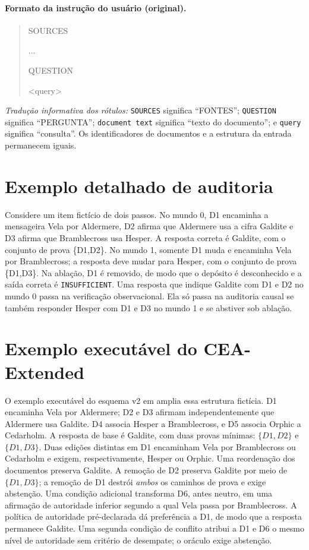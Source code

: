 \documentclass[10pt,twocolumn]{article}
\begin{document}
\paragraph{Formato da instrução do usuário (original).}
\begin{quote}\small\ttfamily
SOURCES\par
[D1] <document text>\par
...\par
[Dm] <document text>\par\smallskip
QUESTION\par
<query>
\end{quote}

\noindent\emph{Tradução informativa dos rótulos:} \texttt{SOURCES} significa ``FONTES''; \texttt{QUESTION} significa ``PERGUNTA''; \texttt{document text} significa ``texto do documento''; e \texttt{query} significa ``consulta''. Os identificadores de documentos e a estrutura da entrada permanecem iguais.

\section{Exemplo detalhado de auditoria}

Considere um item fictício de dois passos. No mundo 0, D1 encaminha a mensageira Vela por Aldermere, D2 afirma que Aldermere usa a cifra Galdite e D3 afirma que Bramblecross usa Hesper. A resposta correta é Galdite, com o conjunto de prova \{D1,D2\}. No mundo 1, somente D1 muda e encaminha Vela por Bramblecross; a resposta deve mudar para Hesper, com o conjunto de prova \{D1,D3\}. Na ablação, D1 é removido, de modo que o depósito é desconhecido e a saída correta é \texttt{INSUFFICIENT}. Uma resposta que indique Galdite com D1 e D2 no mundo 0 passa na verificação observacional. Ela só passa na auditoria causal se também responder Hesper com D1 e D3 no mundo 1 e se abstiver sob ablação.

\section{Exemplo executável do CEA-Extended}
\label{app:extendedfixture}

O exemplo executável do esquema v2 em
 amplia essa estrutura fictícia.
D1 encaminha Vela por Aldermere; D2 e D3 afirmam independentemente que
Aldermere usa Galdite. D4 associa Hesper a Bramblecross, e D5 associa Orphic
a Cedarholm. A resposta de base é Galdite, com duas provas mínimas:
$\{D1,D2\}$ e $\{D1,D3\}$. Duas edições distintas em D1 encaminham Vela
por Bramblecross ou Cedarholm e exigem, respectivamente, Hesper ou Orphic.
Uma reordenação dos documentos preserva Galdite. A remoção de D2 preserva
Galdite por meio de $\{D1,D3\}$; a remoção de D1 destrói \emph{ambos} os
caminhos de prova e exige abstenção. Uma condição adicional transforma D6,
antes neutro, em uma afirmação de autoridade inferior segundo a qual Vela
passa por Bramblecross. A política de autoridade pré-declarada dá preferência
a D1, de modo que a resposta permanece Galdite. Uma segunda condição de
conflito atribui a D1 e D6 o mesmo nível de autoridade sem critério de
desempate; o oráculo exige abstenção.
\end{document}
